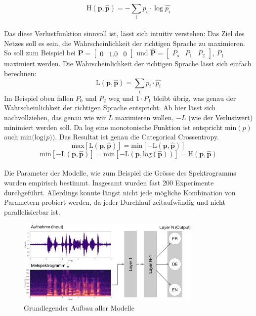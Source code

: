 $$\text{H}(\boldsymbol{p}, \hat{\boldsymbol{p}}) = -\sum\limits_{i} p_i \cdot \log \hat{p_i}$$
\\
Das diese Verlustfunktion sinnvoll ist, lässt sich intuitiv verstehen: Das Ziel des Netzes soll es sein, die Wahrscheinlichkeit der richtigen Sprache zu maximieren. So soll zum Beispiel bei $\boldsymbol{P}=\begin{bmatrix} 0 & 1.0 & 0\end{bmatrix}$ und $\boldsymbol{\hat{P}}=\begin{bmatrix} P_o & P_1 & P_2\end{bmatrix}$,  $ P_1$ maximiert werden. Die Wahrscheinlichkeit der richtigen Sprache lässt sich einfach berechnen:
$$\text{L}(\boldsymbol{p}, \hat{\boldsymbol{p}}) = \sum\limits_{i} p_i \cdot \hat{p_i}$$
Im Beispiel oben fallen $P_0$ und $P_2$ weg und $1\cdot P_1$ bleibt übrig, was genau der Wahrscheinlichkeit der richtigen Sprache entspricht. Ab hier lässt sich nachvollziehen, das genau wie wir $L$ maximieren wollen, $-L$ (wie der Verlustwert) minimiert werden soll. Da $\text{log}$ eine monotonische Funktion ist entspricht $\text{min}(p)$ auch $\text{min(log(}p))$. Das Resultat ist genau die Categorical Crossentropy. \parencite[vgl. ][]{entropy}
$$\text{max}[\text{L}(\boldsymbol{p}, \hat{\boldsymbol{p}})] =\text{min}[-\text{L}(\boldsymbol{p}, \hat{\boldsymbol{p}})]$$
$$\text{min}[-\text{L}(\boldsymbol{p}, \hat{\boldsymbol{p}})] =\text{min}[-\text{L}(\boldsymbol{p}, \text{log}(\boldsymbol{\hat{p}}))] = \text{H}(\boldsymbol{p}, \hat{\boldsymbol{p}})$$
\\
Die Parameter der Modelle, wie zum Beispiel die Grösse des Spektrogramms wurden empirisch bestimmt. Insgesamt wurden fast 200 Experimente durchgeführt. Allerdings konnte längst nicht jede mögliche Kombination von Parametern probiert werden, da jeder Durchlauf zeitaufwändig und nicht parallelisierbar ist.
\begin{figure}[hbt]
	\centering
		\includegraphics[width=0.8\textwidth]{assets/modelflow.png}
	\caption{Grundlegender Aufbau aller Modelle}
	\label{img:workflow}
\end{figure}


